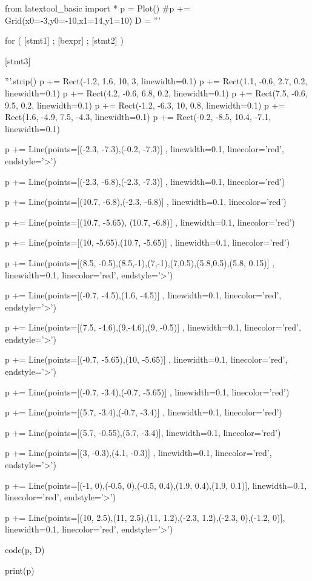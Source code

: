 \begin{python}
from latextool_basic import *
p = Plot()
#p += Grid(x0=-3,y0=-10,x1=14,y1=10)
D = '''





for ( [stmt1] ;         [bexpr]   ;    [stmt2]  )










            [stmt3]







'''.strip()
p += Rect(-1.2, 1.6, 10, 3, linewidth=0.1)
p += Rect(1.1, -0.6, 2.7, 0.2, linewidth=0.1)
p += Rect(4.2, -0.6, 6.8, 0.2, linewidth=0.1)
p += Rect(7.5, -0.6, 9.5, 0.2, linewidth=0.1)
p += Rect(-1.2, -6.3, 10, 0.8, linewidth=0.1)
p += Rect(1.6, -4.9, 7.5, -4.3, linewidth=0.1)
p += Rect(-0.2, -8.5, 10.4, -7.1, linewidth=0.1)

p += Line(points=[(-2.3, -7.3),(-0.2, -7.3)] , linewidth=0.1, linecolor='red', endstyle='>')

p += Line(points=[(-2.3, -6.8),(-2.3, -7.3)] , linewidth=0.1, linecolor='red')

p += Line(points=[(10.7, -6.8),(-2.3, -6.8)] , linewidth=0.1, linecolor='red')

p += Line(points=[(10.7, -5.65), (10.7, -6.8)] , linewidth=0.1, linecolor='red')

p += Line(points=[(10, -5.65),(10.7, -5.65)] , linewidth=0.1, linecolor='red')

p += Line(points=[(8.5, -0.5),(8.5,-1),(7,-1),(7,0.5),(5.8,0.5),(5.8, 0.15)] , linewidth=0.1, linecolor='red', endstyle='>')

p += Line(points=[(-0.7, -4.5),(1.6, -4.5)] , linewidth=0.1, linecolor='red', endstyle='>')

p += Line(points=[(7.5, -4.6),(9,-4.6),(9, -0.5)] , linewidth=0.1, linecolor='red', endstyle='>')

p += Line(points=[(-0.7, -5.65),(10, -5.65)] , linewidth=0.1, linecolor='red', endstyle='>')

p += Line(points=[(-0.7, -3.4),(-0.7, -5.65)] , linewidth=0.1, linecolor='red')

p += Line(points=[(5.7, -3.4),(-0.7, -3.4)] , linewidth=0.1, linecolor='red')

p += Line(points=[(5.7, -0.55),(5.7, -3.4)], linewidth=0.1, linecolor='red')

p += Line(points=[(3, -0.3),(4.1, -0.3)] , linewidth=0.1, linecolor='red', endstyle='>')

p += Line(points=[(-1, 0),(-0.5, 0),(-0.5, 0.4),(1.9, 0.4),(1.9, 0.1)], linewidth=0.1, linecolor='red', endstyle='>')

p += Line(points=[(10, 2.5),(11, 2.5),(11, 1.2),(-2.3, 1.2),(-2.3, 0),(-1.2, 0)], linewidth=0.1, linecolor='red', endstyle='>')


code(p, D)

print(p)
\end{python}

